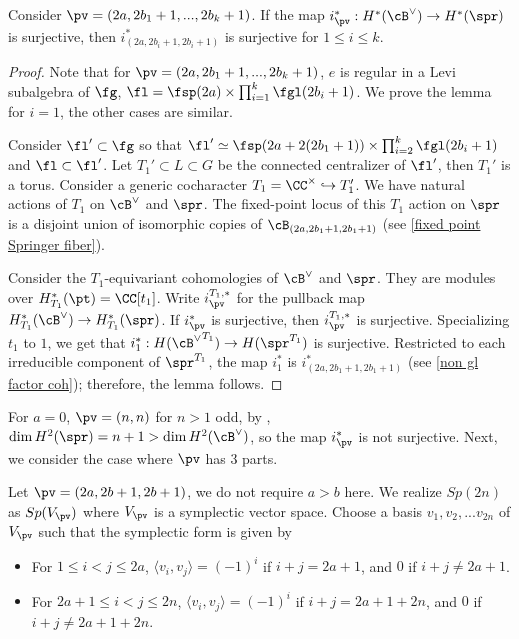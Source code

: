 \documentclass[12pt]{amsart}
\begin{document}
\begin{lemma} \label{reduce to 3}
    Consider $\pv= (2a, 2b_1+1,...,2b_k+1)$. If the map $i_{\pv}^*:H^*(\cB^\vee)\rightarrow H^*(\spr)$ is surjective, then $i_{(2a, 2b_i+1,2b_i+1)}^*$ is surjective for $1\leqslant i\leqslant k$.
\end{lemma}
\begin{proof}
    Note that for $\pv= (2a, 2b_1+1,...,2b_k+1)$, $e$ is regular in a Levi subalgebra of $\fg$, $\fl= \fsp({2a})\times \prod_{i=1}^{k} \fgl({2b_i+1})$. We prove the lemma for $i=1$, the other cases are similar. 
    
    Consider $\fl'\subset \fg$ so that $\fl'\simeq \fsp({2a+2(2b_1+1)})\times \prod_{i=2}^{k} \fgl({2b_i+1})$ and $\fl\subset \fl'$. Let $T_1'\subset L\subset G$ be the connected centralizer of $\fl'$, then $T_1'$ is a torus. Consider a generic cocharacter $T_1=\CC^\times \hookrightarrow T_1'$. We have natural actions of $T_1$ on $\cB^\vee$ and $\spr$. The fixed-point locus of this $T_1$ action on $\spr$ is a disjoint union of isomorphic copies of $\cB_{(2a,2b_1+1,2b_1+1)}$ (see \cref{fixed point Springer fiber}).

    Consider the $T_1$-equivariant cohomologies of $\cB^\vee$ and $\spr$. They are modules over $H_{T_1}^*(\pt)=\CC[t_1]$. Write $i^{T_1, *}_{\pv}$ for the pullback map $H_{T_1}^*(\cB^\vee)\rightarrow H_{T_1}^*(\spr)$. If $i_{\pv}^*$ is surjective, then $i^{T_1, *}_{\pv}$ is surjective. Specializing $t_1$ to $1$, we get that $i^{*}_1: H({\cB^\vee}^{T_1})\rightarrow H(\spr^{T_1})$ is surjective. Restricted to each irreducible component of $\spr^{T_1}$, the map $i^{*}_1$ is $i^{*}_{(2a,2b_1+1, 2b_1+1)}$ (see \cref{non gl factor coh}); therefore, the lemma follows.
\end{proof}

For $a=0$, $\pv= (n,n)$ for $n>1$ odd, by \cite[Proposition 8.1]{Lehn_2011}, $\dim H^2(\spr)= n+1> \dim H^2(\cB^\vee)$, so the map $i_{\pv}^*$ is not surjective. Next, we consider the case where $\pv$ has $3$ parts. 

Let $\pv= (2a, 2b+1, 2b+1)$, we do not require $a>b$ here. We realize $Sp({2n})$ as $Sp(V_\pv)$ where $V_\pv$ is a symplectic vector space. Choose a basis $v_1, v_2,...v_{2n}$ of $V_\pv$ such that the symplectic form is given by 
\begin{itemize}
    \item For $1\leqslant i<j \leqslant 2a$, $\langle v_i, v_j \rangle= (-1)^{i}$ if $i+j= 2a+1$, and $0$ if $i+j\neq 2a+1$.
    \item For $2a+1\leqslant i< j \leqslant 2n$, $\langle v_i, v_j \rangle= (-1)^{i}$ if $i+j= 2a+1+ 2n$, and $0$ if $i+j\neq 2a+1+2n$.
\end{itemize}
\end{document}
